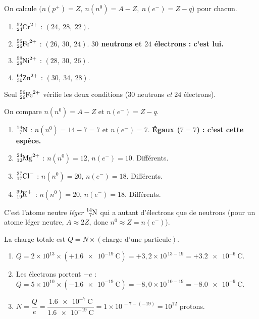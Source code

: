 \documentclass[11pt,a4paper]{article}
\begin{document}
\begin{corrige}
On calcule $\big(n(p^+)=Z,\ n(n^0)=A-Z,\ n(e^-)=Z-q\big)$ pour chacun.
\begin{enumerate}[label=\alph*)]
  \item $\ce{^{52}_{24}Cr^{2+}}$ : $(24,\ 28,\ 22)$.
  \item $\ce{^{56}_{26}Fe^{2+}}$ : $(26,\ 30,\ 24)$. \quad\textbf{$30$ neutrons et $24$ électrons : c'est lui.}
  \item $\ce{^{58}_{28}Ni^{2+}}$ : $(28,\ 30,\ 26)$.
  \item $\ce{^{64}_{30}Zn^{2+}}$ : $(30,\ 34,\ 28)$.
\end{enumerate}
Seul $\ce{^{56}_{26}Fe^{2+}}$ vérifie les deux conditions ($30$ neutrons \emph{et} $24$ électrons).
\end{corrige}

\begin{corrige}
On compare $n(n^0)=A-Z$ et $n(e^-)=Z-q$.
\begin{enumerate}[label=\alph*)]
  \item $\ce{^{14}_{7}N}$ : $n(n^0)=14-7=7$ et $n(e^-)=7$. \quad\textbf{Égaux ($7=7$) : c'est cette espèce.}
  \item $\ce{^{24}_{12}Mg^{2+}}$ : $n(n^0)=12$, $n(e^-)=10$. Différents.
  \item $\ce{^{37}_{17}Cl^{-}}$ : $n(n^0)=20$, $n(e^-)=18$. Différents.
  \item $\ce{^{39}_{19}K^{+}}$ : $n(n^0)=20$, $n(e^-)=18$. Différents.
\end{enumerate}
C'est l'atome neutre \emph{léger} $\ce{^{14}_{7}N}$ qui a autant d'électrons que de neutrons (pour un
atome léger neutre, $A \approx 2Z$, donc $n^0 \approx Z = n(e^-)$).
\end{corrige}

\begin{corrige}
La charge totale est $Q = N \times (\text{charge d'une particule})$.
\begin{enumerate}[label=\alph*)]
  \item $Q = 2\times10^{13} \times (+\SI{1,6e-19}{\coulomb}) = +3{,}2\times10^{\,13-19} = +\SI{3,2e-6}{\coulomb}$.
  \item Les électrons portent $-e$ : $Q = 5\times10^{10} \times (-\SI{1,6e-19}{\coulomb})
        = -8{,}0\times10^{\,10-19} = -\SI{8,0e-9}{\coulomb}$.
  \item $N = \dfrac{Q}{e} = \dfrac{\SI{1,6e-7}{\coulomb}}{\SI{1,6e-19}{\coulomb}}
        = 1 \times 10^{\,-7-(-19)} = 10^{12}$ protons.
\end{enumerate}
\end{corrige}
\end{document}
